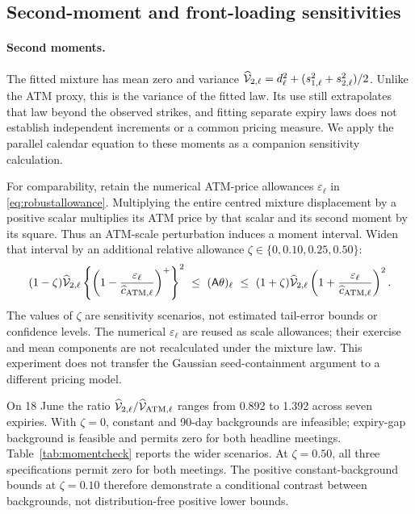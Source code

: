 \subsection{Second-moment and front-loading sensitivities}\label{app:finalsensitivities}
\paragraph{Second moments.}
The fitted mixture has mean zero and variance
$\widehat{\mathcal V}_{2,\ell}=d_\ell^2+(s_{1,\ell}^2+s_{2,\ell}^2)/2$.
Unlike the ATM proxy, this is the variance of the fitted law. Its use still extrapolates that law beyond the observed strikes, and fitting separate expiry laws does not establish independent increments or a common pricing measure. We apply the parallel calendar equation to these moments as a companion sensitivity calculation.

For comparability, retain the numerical ATM-price allowances $\varepsilon_\ell$ in \eqref{eq:robustallowance}. Multiplying the entire centred mixture displacement by a positive scalar multiplies its ATM price by that scalar and its second moment by its square. Thus an ATM-scale perturbation induces a moment interval. Widen that interval by an additional relative allowance $\zeta\in\{0,0.10,0.25,0.50\}$:
\begin{equation}\label{eq:momentinterval}
(1-\zeta)\widehat{\mathcal V}_{2,\ell}
 \left\{\left(1-\frac{\varepsilon_\ell}{\widehat c_{{\rm ATM},\ell}}\right)^+\right\}^2
\ \leq\ (\mathsf A\theta)_\ell\ \leq\
(1+\zeta)\widehat{\mathcal V}_{2,\ell}
 \left(1+\frac{\varepsilon_\ell}{\widehat c_{{\rm ATM},\ell}}\right)^2.
\end{equation}
The values of $\zeta$ are sensitivity scenarios, not estimated tail-error bounds or confidence levels. The numerical $\varepsilon_\ell$ are reused as scale allowances; their exercise and mean components are not recalculated under the mixture law. This experiment does not transfer the Gaussian seed-containment argument to a different pricing model.

On 18 June the ratio $\widehat{\mathcal V}_{2,\ell}/\widehat{\mathcal V}_{{\rm ATM},\ell}$ ranges from 0.892 to 1.392 across seven expiries. With $\zeta=0$, constant and 90-day backgrounds are infeasible; expiry-gap background is feasible and permits zero for both headline meetings. Table~\ref{tab:momentcheck} reports the wider scenarios. At $\zeta=0.50$, all three specifications permit zero for both meetings. The positive constant-background bounds at $\zeta=0.10$ therefore demonstrate a conditional contrast between backgrounds, not distribution-free positive lower bounds.

